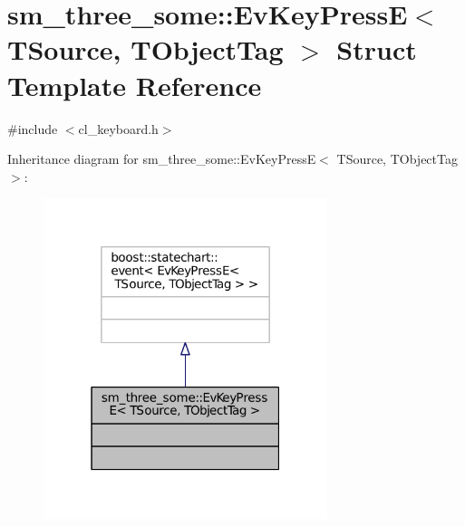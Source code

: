 \hypertarget{structsm__three__some_1_1EvKeyPressE}{}\section{sm\+\_\+three\+\_\+some\+:\+:Ev\+Key\+PressE$<$ T\+Source, T\+Object\+Tag $>$ Struct Template Reference}
\label{structsm__three__some_1_1EvKeyPressE}


{\ttfamily \#include $<$cl\+\_\+keyboard.\+h$>$}



Inheritance diagram for sm\+\_\+three\+\_\+some\+:\+:Ev\+Key\+PressE$<$ T\+Source, T\+Object\+Tag $>$\+:
\nopagebreak
\begin{figure}[H]
\begin{center}
\leavevmode
\includegraphics[width=235pt]{structsm__three__some_1_1EvKeyPressE__inherit__graph}
\end{center}
\end{figure}


